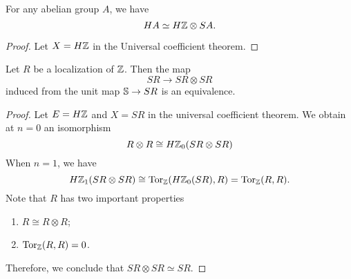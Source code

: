 \begin{corollary}
	For any abelian group $A$, we have 
	\[
	HA\simeq H{\mathbb{Z}}\otimes SA.
	\]
\end{corollary}
\begin{proof}
	Let $X=H{\mathbb{Z}}$ in the Universal coefficient theorem.
\end{proof}

\begin{corollary}
Let $R$ be a localization of ${\mathbb{Z}}$.
	Then the map
	\[
	SR\to SR\otimes SR
	\]
	induced from the unit map ${\mathbb{S}} \to SR$ is an equivalence.
\end{corollary}
\begin{proof}
	Let $E=H{\mathbb{Z}}$ and $X=SR$ in the universal coefficient theorem. We obtain at $n=0$
	an isomorphism
	$$
	R\otimes R \cong H{\mathbb{Z}}_0(SR \otimes SR)
	$$
	When $n= 1$, we have
	\[
	H{\mathbb{Z}}_1(SR \otimes SR) \cong \operatorname{Tor}_{\mathbb{Z}}(H{\mathbb{Z}}_{0}(SR),R)=\operatorname{Tor}_{\mathbb{Z}}(R,R).
	\]
	Note that $R$ has two important properties
	\begin{enumerate}
		\item $R\cong R\otimes R$;
		\item $\operatorname{Tor}_{{\mathbb{Z}}}(R,R)=0$.
	\end{enumerate}
	Therefore, we conclude that $SR\otimes SR\simeq SR$. 
\end{proof}


